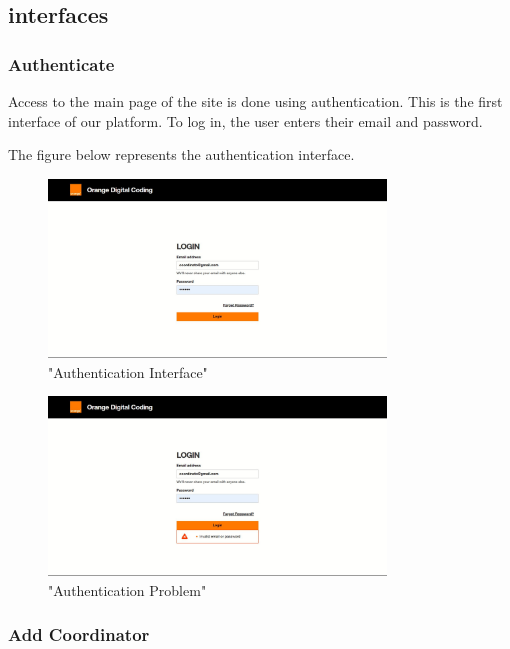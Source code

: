\subsection{interfaces}
\newpage
\subsubsection{Authenticate}

Access to the main page of the site is done using authentication. This is the first interface of our platform. To log in, the user enters their email and password.

The figure below represents the authentication interface.

\begin{figure}[h!]
    \centering
    \includegraphics[width=0.8\textwidth]{images/login.JPG}
    \caption{"Authentication Interface"}
    \label{fig:"Authentication Interface"}
\end{figure}


\begin{figure}[h!]
    \centering
    \includegraphics[width=0.8\textwidth]{images/loginerr.JPG}
    \caption{"Authentication Problem"}
    \label{fig:"Authentication Problem"}
\end{figure}
\subsubsection{Add Coordinator}
 